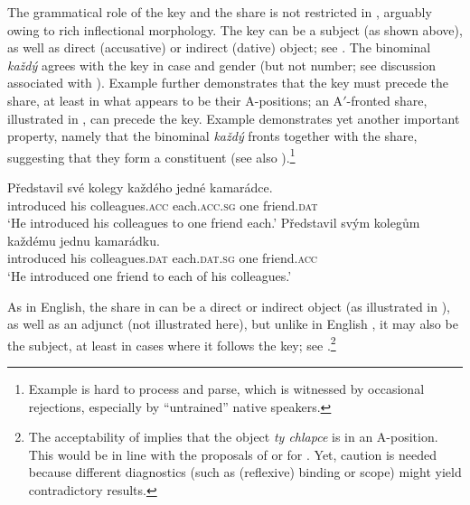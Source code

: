 \documentclass[output=paper,colorlinks,citecolor=brown,newtxmath]{langscibook}
\begin{document}
\noindent The grammatical role of the key and the share is not restricted in , arguably owing to rich inflectional morphology. The key can be a subject (as shown above), as well as direct (accusative) or indirect (dative) object; see . The binominal \textit{každý} agrees with the key in case and gender (but not number; see discussion associated with ). Example  further demonstrates that the key must precede the share, at least in what appears to be their A-positions; an A$'$-fronted share, illustrated in , can precede the key. Example  demonstrates yet another important property, namely that the binominal \textit{každý} fronts together with the share, suggesting that they form a constituent (see also \citealt[437]{Safir1988}).\footnote{Example  is hard to process and parse, which is witnessed by occasional rejections, especially by “untrained'' native speakers.}

\ea\label{ex:key-role}\ea\gll Představil své kolegy každého jedné kamarádce.\\
introduced his colleagues.\textsc{acc} each.\textsc{acc.sg} one friend.\textsc{dat}\\
\glt `He introduced his colleagues to one friend each.'
\ex\gll Představil svým kolegům každému jednu kamarádku.\\
introduced his colleagues.\textsc{dat} each.\textsc{dat.sg} one friend.\textsc{acc}\\
\glt `He introduced one friend to each of his colleagues.'
\z\z

\ea\label{ex:key-order}
\z\z

\noindent As in English, the share in  can be a direct or indirect object (as illustrated in ), as well as an adjunct (not illustrated here), but unlike in English \citep[436]{Safir1988}, it may also be the subject, at least in cases where it follows the key; see .\footnote{The acceptability of  implies that the object \textit{ty chlapce} is in an A-position. This would be in line with the proposals of \citet{Bailyn2004} or \citet{Titov2018} for . Yet, caution is needed because different diagnostics (such as (reflexive) binding or scope) might yield contradictory results.}
\end{document}
